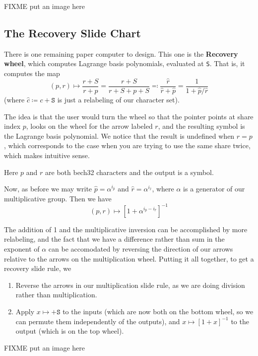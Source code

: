 \documentclass[letterpaper]{article}
\theoremstyle{xxx}
\theoremstyle{evil}
\theoremstyle{yyy}
\theoremstyle{plain}
\theoremstyle{zzz}
\newcommand{\vc}[1]{\texttt{#1}} %
\begin{document}
FIXME put an image here

\subsection{The Recovery Slide Chart}

There is one remaining paper computer to design. This one is the \textbf{Recovery
wheel}, which computes Lagrange basis polynomials, evaluated at \vc{S}. That is,
it computes the map
\[ (p, r) \mapsto \frac{r + S}{r + p} = \frac{r + S}{r + S + p + S} \eqqcolon \frac{\hat{r}}{\hat{r}+\hat{p}} = \frac{1}{1 + \hat{p}/\hat{r}} \]
(where $\hat{c}\coloneqq c+\vc{S}$ is just a relabeling of our character set).

The idea is that the user would turn the wheel so that the pointer points at
share index $p$, looks on the wheel for the arrow labeled $r$, and the resulting
symbol is the Lagrange basis polynomial. We notice that the result is undefined
when $r = p$, which corresponds to the case when you are trying to use the same
share twice, which makes intuitive sense.

Here $p$ and $r$ are both bech32 characters and the output is a symbol.

Now, as before we may write $\hat{p}=\alpha^{i_{\hat{p}}}$ and
$\hat{r}=\alpha^{i_{\hat{r}}}$, where $\alpha$ is a generator of our multiplicative
group. Then we have
\[ (p, r) \mapsto \left[ 1 + \alpha^{i_{\hat{p}} - i_{\hat{r}}} \right]^{-1} \]

The addition of 1 and the multiplicative inversion can be accomplished by more
relabeling, and the fact that we have a difference rather than sum in the exponent
of $\alpha$ can be accomodated by reversing the direction of our arrows relative
to the arrows on the multiplication wheel. Putting it all together, to get a
recovery slide rule, we
\begin{enumerate}
\item Reverse the arrows in our multiplication slide rule, as we are doing
division rather than multiplication.
\item Apply $x\mapsto+\vc{S}$ to the inputs (which are now both on the bottom
wheel, so we can permute them independently of the outputs), and
$x\mapsto[1+x]^{-1}$ to the output (which is on the top wheel).
\end{enumerate}

FIXME put an image here
\end{document}
